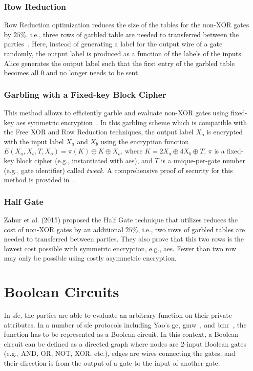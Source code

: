 \subsubsection{Row Reduction}\label{sssec:prelim-row}
Row Reduction optimization reduces the size of the tables for the non-XOR gates by $25\%$, i.e., three rows of garbled table are needed to transferred between the parties~\cite{naor1999privacy}.
Here, instead of generating a label for the output wire of a gate randomly, the output label is produced as a function of the labels of the inputs.
Alice generates the output label such that the first entry of the garbled table becomes all $0$ and no longer needs to be sent.

\subsubsection{Garbling with a Fixed-key Block Cipher}\label{sssec:prelim-aes}
This method allows to efficiently garble and evaluate non-XOR gates using fixed-key \acrfull{aes} symmetric encryption~\cite{bellare2013efficient}.
In this garbling scheme which is compatible with the Free XOR and Row Reduction techniques, the output label $X_{o}$ is encrypted with the input label $X_{a}$ and $X_{b}$ using the encryption function $E(X_a,X_b,T,X_o) = \pi(K) \oplus K \oplus X_o$, where $K=2X_a\oplus4X_b\oplus T$, $\pi$ is a fixed-key block cipher (e.g., instantiated with \acrshort{aes}), and $T$ is a unique-per-gate number (e.g., gate identifier) called \emph{tweak}.
A comprehensive proof of security for this method is provided in~\cite{bellare2013efficient}.

\subsubsection{Half Gate}\label{sssec:prelim-half}
Zahur et al. (2015) proposed the Half Gate technique that utilizes reduces the cost of non-XOR gates by an additional $25\%$, i.e., two rows of garbled tables are needed to transferred between parties\cite{zahur2015two}.
They also prove that this two rows is the lowest cost possible with symmetric encryption, e.g., \acrshort{aes}.
Fewer than two row may only be possible using costly asymmetric encryption.

\section{Boolean Circuits}\label{sec:prelim-circuit}
In \acrshort{sfe}, the parties are able to evaluate an arbitrary function on their private attributes.
In a number of \acrshort{sfe} protocols including Yao's \acrshort{gc}, \acrfull{gmw}~\cite{goldreich1987play}, and \acrfull{bmr}~\cite{beaver1990round}, the function has to be represented as a Boolean circuit.
In this context, a Boolean circuit can be defined as a directed graph where nodes are 2-input Boolean gates (e.g., AND, OR, NOT, XOR, etc.), edges are wires connecting the gates, and their direction is from the output of a gate to the input of another gate.

